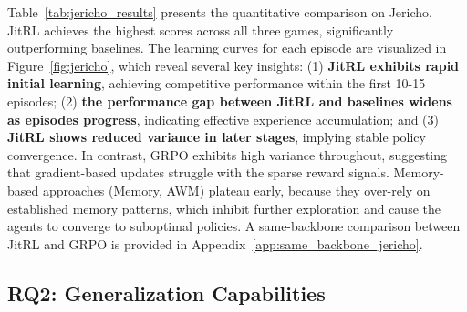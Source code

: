 



Table~\ref{tab:jericho_results} presents the quantitative comparison on Jericho. JitRL achieves the highest scores across all three games, significantly outperforming baselines. The learning curves for each episode are visualized in Figure~\ref{fig:jericho}, which reveal several key insights: (1) \textbf{JitRL exhibits rapid initial learning}, achieving competitive performance within the first 10-15 episodes; (2) \textbf{the performance gap between JitRL and baselines widens as episodes progress}, indicating effective experience accumulation; and (3) \textbf{JitRL shows reduced variance in later stages}, implying stable policy convergence. In contrast, GRPO exhibits high variance throughout, suggesting that gradient-based updates struggle with the sparse reward signals. Memory-based approaches (Memory, AWM) plateau early, because they over-rely on established memory patterns, which inhibit further exploration and cause the agents to converge to suboptimal policies. A same-backbone comparison between JitRL and GRPO is provided in Appendix~\ref{app:same_backbone_jericho}.




\subsection{RQ2: Generalization Capabilities}

